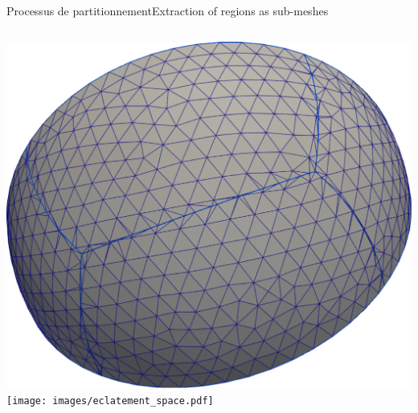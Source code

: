 \documentclass[compress,10pt,aspectratio=169]{beamer}
\begin{document}
\begin{frame}{Processus de partitionnement}{Extraction of regions as sub-meshes}
\begin{columns}
\begin{column}{0.4\textwidth}
\centering
\includegraphics[scale=0.105]{images/split_triangles_space.pdf}
\\\vspace{0.12cm}
\texttt{[image: images/eclatement\_space.pdf]}\vspace{0.3cm}
\end{column}

\end{columns}
\end{frame}
\end{document}
